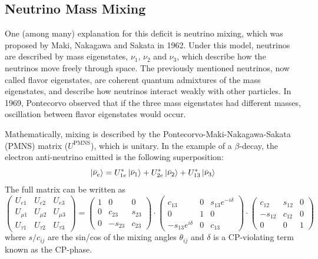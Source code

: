 \documentclass[/main.tex]{subfiles}
\begin{document}
\subsection{Neutrino Mass Mixing}
One (among many) explanation for this deficit is neutrino mixing, which was proposed by Maki, Nakagawa and Sakata in 1962\cite{Maki1962}.
Under this model, neutrinos are described by mass eigenstates, $\nu_1$, $\nu_2$ and $\nu_3$, which describe how the neutrinos move freely through space.
The previously mentioned neutrinos, now called flavor eigenstates, are coherent quantum admixtures of the mass eigenstates, and describe how neutrinos interact weakly with other particles.
In 1969, Pontecorvo observed that if the three mass eigenstates had different masses, oscillation between flavor eigenstates would occur.

Mathematically, mixing is described by the Pontecorvo-Maki-Nakagawa-Sakata (PMNS) matrix ($U^{\mathrm{PMNS}}$), which is unitary.
In the example of a $\beta$-decay, the electron anti-neutrino emitted is the following superposition:
\begin{equation}
  \ket{\bar\nu_e}=U^*_{1e}\ket{\bar\nu_1}+U^*_{2e}\ket{\bar\nu_2}+U^*_{13}\ket{\bar\nu_3}
\end{equation}
The full matrix can be written as
\begin{equation} \label{eq:PMNS}
  \begin{pmatrix}
    U_{e1} & U_{e2} & U_{e3} \\
    U_{\mu1} & U_{\mu2} & U_{\mu3} \\
    U_{\tau1} & U_{\tau2} & U_{\tau3}
  \end{pmatrix} = \begin{pmatrix}
    1 & 0 & 0 \\
    0 & c_{23} & s_{23} \\
    0 & -s_{23} & c_{23}
  \end{pmatrix} \cdot \begin{pmatrix}
    c_{13} & 0 & s_{13}e^{-i\delta} \\
    0 & 1 & 0 \\
    -s_{13}e^{i\delta} & 0 & c_{13}
  \end{pmatrix} \cdot \begin{pmatrix}
    c_{12} & s_{12} & 0 \\
    -s_{12} & c_{12} & 0 \\
    0 & 0 & 1
  \end{pmatrix}
\end{equation}
where $s/c_{ij}$ are the sin/cos of the mixing angles $\theta_{ij}$ and $\delta$ is a CP-violating term known as the CP-phase.
\end{document}
